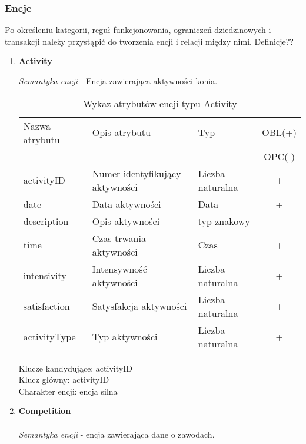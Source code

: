 \documentclass[12pt,twoside]{report}
\begin{document}
\subsubsection{Encje}
Po określeniu kategorii, reguł funkcjonowania, ograniczeń dziedzinowych i transakcji należy przystąpić do tworzenia encji i relacji między nimi.
Definicje??
\\
\begin{enumerate}[start=1,label={\bfseries ENC\textbackslash00\arabic*}]
	
	\item \textbf{Activity}
	
	\textit{Semantyka encji} - Encja zawierająca aktywności konia.
	
	\begin{table}[h!]
		\centering
		\begin{tabular}{|l|l|l|c|}
			\hline
			Nazwa atrybutu & Opis atrybutu & Typ & OBL(+) \\
			& & &  OPC(-) \\
			\hline
			activityID & Numer identyfikujący aktywności & Liczba naturalna & + \\
			\hline
			date & Data aktywności & Data & + \\
			\hline
			description & Opis aktywności & typ znakowy & - \\
			\hline
			time &  Czas trwania aktywności & Czas & + \\
			\hline
			intensivity & Intensywność aktywności & Liczba naturalna & + \\
			\hline
			satisfaction & Satysfakcja aktywności & Liczba naturalna & + \\
			\hline
			activityType &  Typ aktywności & Liczba naturalna & + \\
			\hline
		\end{tabular}
		\caption{Wykaz atrybutów encji typu Activity }
	\end{table}
	Klucze kandydujące: activityID \\
	Klucz główny: activityID \\
	Charakter encji: encja silna \\
	

	
	
	\item \textbf{Competition}\\ \\
	\textit{Semantyka encji} - encja zawierająca dane o zawodach.
	

\end{enumerate}
\end{document}
